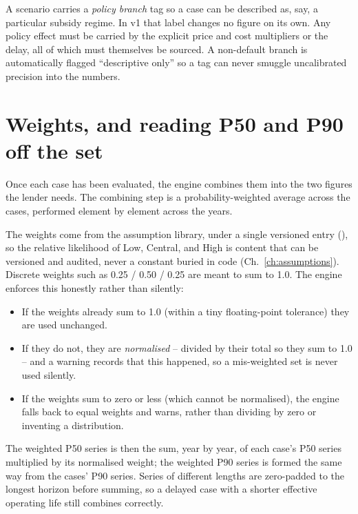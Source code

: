 \begin{caution}
A scenario carries a \emph{policy branch} tag so a case can be described as, say, a particular subsidy regime. In v1 that label changes no figure on its own. Any policy effect must be carried by the explicit price and cost multipliers or the delay, all of which must themselves be sourced. A non-default branch is automatically flagged ``descriptive only'' so a tag can never smuggle uncalibrated precision into the numbers.
\end{caution}

\section{Weights, and reading P50 and P90 off the set}

Once each case has been evaluated, the engine combines them into the two figures the lender needs. The combining step is a probability-weighted average across the cases, performed element by element across the years.

The weights come from the assumption library, under a single versioned entry (), so the relative likelihood of Low, Central, and High is content that can be versioned and audited, never a constant buried in code (Ch.~\ref{ch:assumptions}). Discrete weights such as 0.25 / 0.50 / 0.25 are meant to sum to 1.0. The engine enforces this honestly rather than silently:

\begin{itemize}
  \item If the weights already sum to 1.0 (within a tiny floating-point tolerance) they are used unchanged.
  \item If they do not, they are \emph{normalised} -- divided by their total so they sum to 1.0 -- and a warning records that this happened, so a mis-weighted set is never used silently.
  \item If the weights sum to zero or less (which cannot be normalised), the engine falls back to equal weights and warns, rather than dividing by zero or inventing a distribution.
\end{itemize}

The weighted P50 series is then the sum, year by year, of each case's P50 series multiplied by its normalised weight; the weighted P90 series is formed the same way from the cases' P90 series. Series of different lengths are zero-padded to the longest horizon before summing, so a delayed case with a shorter effective operating life still combines correctly.

